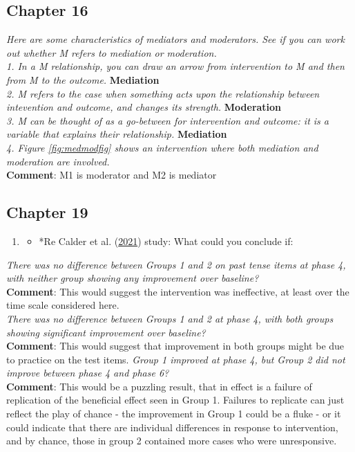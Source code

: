\documentclass{krantz}
\providecommand{\tightlist}{%
\setlength{\itemsep}{0pt}\setlength{\parskip}{0pt}}
\begin{document}
\hypertarget{chapter-16}{%
\subsection{Chapter 16}\label{chapter-16}}

\emph{Here are some characteristics of mediators and moderators. See if you can work out whether M refers to mediation or moderation.}\\
\emph{1. In a M relationship, you can draw an arrow from intervention to M and then from M to the outcome.} \textbf{Mediation}\\
\emph{2. M refers to the case when something acts upon the relationship between intevention and outcome, and changes its strength.} \textbf{Moderation}\\
\emph{3. M can be thought of as a go-between for intervention and outcome: it is a variable that explains their relationship.} \textbf{Mediation}\\
\emph{4. Figure \ref{fig:medmodfig} shows an intervention where both mediation and moderation are involved.}\\
\textbf{Comment}: M1 is moderator and M2 is mediator

\hypertarget{chapter-19}{%
\subsection{Chapter 19}\label{chapter-19}}

\begin{enumerate}
\def\labelenumi{\arabic{enumi}.}
\item
  \begin{itemize}
  \tightlist
  \item
    *Re Calder et al. (\protect\hyperlink{ref-calder2021}{2021}) study: What could you conclude if:
  \end{itemize}
\end{enumerate}

\emph{There was no difference between Groups 1 and 2 on past tense items at phase 4, with neither group showing any improvement over baseline?}\\
\textbf{Comment}: This would suggest the intervention was ineffective, at least over the time scale considered here.\\
\emph{There was no difference between Groups 1 and 2 at phase 4, with both groups showing significant improvement over baseline?}\\
\textbf{Comment}: This would suggest that improvement in both groups might be due to practice on the test items.
\emph{Group 1 improved at phase 4, but Group 2 did not improve between phase 4 and phase 6?}\\
\textbf{Comment}: This would be a puzzling result, that in effect is a failure of replication of the beneficial effect seen in Group 1. Failures to replicate can just reflect the play of chance - the improvement in Group 1 could be a fluke - or it could indicate that there are individual differences in response to intervention, and by chance, those in group 2 contained more cases who were unresponsive.
\end{document}
